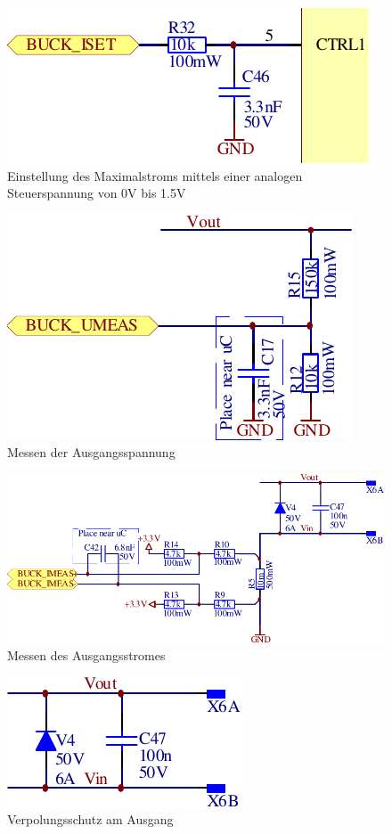 \begin{figure}[H]
    \center
    \includegraphics[width=.4\textwidth]{images/circuit/buck-iset.pdf}
    \caption{Einstellung des Maximalstroms mittels einer analogen Steuerspannung von 0V bis 1.5V}
    \label{fig:circuit:buck:iset}
\end{figure}

\begin{figure}[H]
    \center
    \includegraphics[width=.45\textwidth]{images/circuit/buck-umeas.pdf}
    \caption{Messen der Ausgangsspannung}
    \label{fig:circuit:buck:umeas}
\end{figure}

\begin{figure}[H]
    \center
    \includegraphics[width=.85\textwidth]{images/circuit/buck-imeas.pdf}
    \caption{Messen des Ausgangsstromes}
    \label{fig:circuit:buck:imeas}
\end{figure}

\begin{figure}[H]
    \center
    \includegraphics[width=.35\textwidth]{images/circuit/output-connectors.pdf}
    \caption{Verpolungsschutz am Ausgang}
    \label{fig:circuit:output}
\end{figure}


